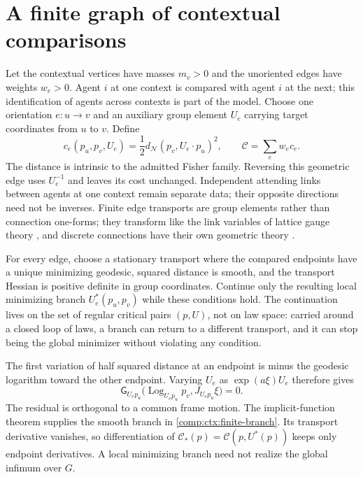 \section{A finite graph of contextual comparisons}

Let the contextual vertices have masses $m_v>0$ and the unoriented edges have weights $w_e>0$. Agent $i$ at one context is compared with agent $i$ at the next; this identification of agents across contexts is part of the model. Choose one orientation $e:u\to v$ and an auxiliary group element $U_e$ carrying target coordinates from $u$ to $v$. Define
\begin{equation}
 c_e(p_u,p_v,U_e)=\frac12d_{\mathcal N}(p_v,U_e\cdot p_u)^2,
 \qquad \mathcal C=\sum_e w_e c_e.
 \label{comp:ctx:edge}
\end{equation}
The distance is intrinsic to the admitted Fisher family. Reversing this geometric edge uses $U_e^{-1}$ and leaves its cost unchanged. Independent attending links between agents at one context remain separate data; their opposite directions need not be inverses. Finite edge transports are group elements rather than connection one-forms; they transform like the link variables of lattice gauge theory \citep{Wilson1974}, and discrete connections have their own geometric theory \citep{LeokMarsdenWeinstein2005}.

For every edge, choose a stationary transport where the compared endpoints have a unique minimizing geodesic, squared distance is smooth, and the transport Hessian is positive definite in group coordinates. Continue only the resulting local minimizing branch $U_e^*(p_u,p_v)$ while these conditions hold. The continuation lives on the set of regular critical pairs $(p,U)$, not on law space: carried around a closed loop of laws, a branch can return to a different transport, and it can stop being the global minimizer without violating any condition.

The first variation of half squared distance at an endpoint is minus the geodesic logarithm toward the other endpoint. Varying $U_e$ as $\exp(a\xi)U_e$ therefore gives
\begin{equation}
 \mathsf G_{U_ep_u}\bigl(\operatorname{Log}_{U_ep_u}p_v,
                                      J_{U_ep_u}\xi\bigr)=0.
 \label{comp:ctx:finite-normal}
\end{equation}
The residual is orthogonal to a common frame motion. The implicit-function theorem supplies the smooth branch in \cref{comp:ctx:finite-branch}. Its transport derivative vanishes, so differentiation of $\mathcal C_*(p)=\mathcal C(p,U^*(p))$ keeps only endpoint derivatives. A local minimizing branch need not realize the global infimum over $G$.

